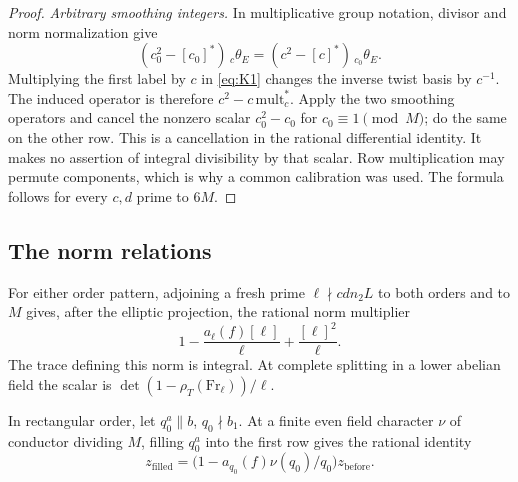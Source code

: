 \begin{proof}
\emph{Arbitrary smoothing integers.}
In multiplicative group notation, divisor and norm normalization give
\[
 (c_0^2-[c_0]^*)\,{}_c\theta_E
                  =(c^2-[c]^*)\,{}_{c_0}\theta_E.
\]
Multiplying the first label by \(c\) in \eqref{eq:K1} changes the inverse
twist basis by \(c^{-1}\).  The induced operator is therefore
\(c^2-c\,\mathrm{mult}_c^*\).  Apply the two smoothing operators and
cancel the nonzero scalar \(c_0^2-c_0\) for
\(c_0\equiv1\pmod M\); do the same on the other row.  This is a
cancellation in the rational differential identity.  It makes no
assertion of integral divisibility by that scalar.  Row multiplication
may permute components, which is why a common calibration was used.
The formula follows for every \(c,d\) prime to \(6M\).
\end{proof}

\subsection{The norm relations}

\begin{proposition}
\label{prop:siegel-norms}
For either order pattern, adjoining a fresh prime
\(\ell\nmid cdn_2L\) to both orders and to \(M\) gives, after the
elliptic projection, the rational norm multiplier
\[
                   1-\frac{a_\ell(f)[\ell]}{\ell}
                               +\frac{[\ell]^2}{\ell}.
\]
The trace defining this norm is integral.  At complete splitting in a
lower abelian field the scalar is
\(\det(1-\rho_T(\mathrm{Fr}_\ell))/\ell\).

In rectangular order, let \(q_0^a\parallel b\), \(q_0\nmid b_1\).
At a finite even field character \(\nu\) of conductor dividing \(M\),
filling \(q_0^a\) into the first row gives the rational identity
\[
 z_{\mathrm{filled}}
       =\bigl(1-a_{q_0}(f)\nu(q_0)/q_0\bigr)
                                      z_{\mathrm{before}}.
\]
\end{proposition}

